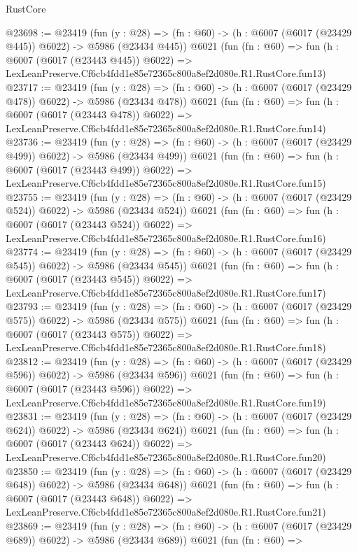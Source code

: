 \begin{lexlean}{RustCore}
\begin{coremodule}
@23698 := @23419
    (fun (y : @28) => (fn : @60) -> (h : @6007 (@6017 (@23429 @445)) @6022) -> @5986 (@23434 @445))
    @6021
    (fun (fn : @60) =>
    fun (h : @6007 (@6017 (@23443 @445)) @6022) =>
    LexLeanPreserve.Cf6cb4fdd1e85e72365c800a8ef2d080e.R1.RustCore.fun13)
@23717 := @23419
    (fun (y : @28) => (fn : @60) -> (h : @6007 (@6017 (@23429 @478)) @6022) -> @5986 (@23434 @478))
    @6021
    (fun (fn : @60) =>
    fun (h : @6007 (@6017 (@23443 @478)) @6022) =>
    LexLeanPreserve.Cf6cb4fdd1e85e72365c800a8ef2d080e.R1.RustCore.fun14)
@23736 := @23419
    (fun (y : @28) => (fn : @60) -> (h : @6007 (@6017 (@23429 @499)) @6022) -> @5986 (@23434 @499))
    @6021
    (fun (fn : @60) =>
    fun (h : @6007 (@6017 (@23443 @499)) @6022) =>
    LexLeanPreserve.Cf6cb4fdd1e85e72365c800a8ef2d080e.R1.RustCore.fun15)
@23755 := @23419
    (fun (y : @28) => (fn : @60) -> (h : @6007 (@6017 (@23429 @524)) @6022) -> @5986 (@23434 @524))
    @6021
    (fun (fn : @60) =>
    fun (h : @6007 (@6017 (@23443 @524)) @6022) =>
    LexLeanPreserve.Cf6cb4fdd1e85e72365c800a8ef2d080e.R1.RustCore.fun16)
@23774 := @23419
    (fun (y : @28) => (fn : @60) -> (h : @6007 (@6017 (@23429 @545)) @6022) -> @5986 (@23434 @545))
    @6021
    (fun (fn : @60) =>
    fun (h : @6007 (@6017 (@23443 @545)) @6022) =>
    LexLeanPreserve.Cf6cb4fdd1e85e72365c800a8ef2d080e.R1.RustCore.fun17)
@23793 := @23419
    (fun (y : @28) => (fn : @60) -> (h : @6007 (@6017 (@23429 @575)) @6022) -> @5986 (@23434 @575))
    @6021
    (fun (fn : @60) =>
    fun (h : @6007 (@6017 (@23443 @575)) @6022) =>
    LexLeanPreserve.Cf6cb4fdd1e85e72365c800a8ef2d080e.R1.RustCore.fun18)
@23812 := @23419
    (fun (y : @28) => (fn : @60) -> (h : @6007 (@6017 (@23429 @596)) @6022) -> @5986 (@23434 @596))
    @6021
    (fun (fn : @60) =>
    fun (h : @6007 (@6017 (@23443 @596)) @6022) =>
    LexLeanPreserve.Cf6cb4fdd1e85e72365c800a8ef2d080e.R1.RustCore.fun19)
@23831 := @23419
    (fun (y : @28) => (fn : @60) -> (h : @6007 (@6017 (@23429 @624)) @6022) -> @5986 (@23434 @624))
    @6021
    (fun (fn : @60) =>
    fun (h : @6007 (@6017 (@23443 @624)) @6022) =>
    LexLeanPreserve.Cf6cb4fdd1e85e72365c800a8ef2d080e.R1.RustCore.fun20)
@23850 := @23419
    (fun (y : @28) => (fn : @60) -> (h : @6007 (@6017 (@23429 @648)) @6022) -> @5986 (@23434 @648))
    @6021
    (fun (fn : @60) =>
    fun (h : @6007 (@6017 (@23443 @648)) @6022) =>
    LexLeanPreserve.Cf6cb4fdd1e85e72365c800a8ef2d080e.R1.RustCore.fun21)
@23869 := @23419
    (fun (y : @28) => (fn : @60) -> (h : @6007 (@6017 (@23429 @689)) @6022) -> @5986 (@23434 @689))
    @6021
    (fun (fn : @60) =>

\end{coremodule}
\end{lexlean}

